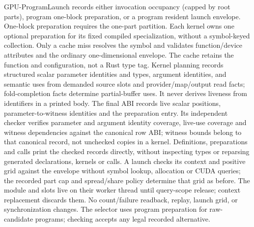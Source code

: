 GPU-ProgramLaunch records either invocation occupancy (capped by root parts),
program one-block preparation, or a program resident launch envelope. One-block
preparation requires the one-part partition. Each kernel owns one optional
preparation for its fixed compiled specialization, without a symbol-keyed
collection. Only a cache miss resolves the symbol and validates function/device
attributes and the ordinary one-dimensional envelope. The cache retains the
function and configuration, not a Rust type tag. Kernel planning records
structured scalar parameter identities and types, argument identities, and
semantic uses from demanded source slots and provider/map/output read facts;
fold-completion facts determine partial-buffer uses. It never derives liveness
from identifiers in a printed body. The final ABI records live scalar
positions, parameter-to-witness identities and the preparation entry.
Its independent checker verifies parameter and argument identity coverage,
live-use coverage and witness dependencies against the canonical row ABI;
witness bounds belong to that canonical record, not unchecked copies in a
kernel. Definitions, preparations and calls print the checked records directly,
without inspecting types or reparsing generated declarations, kernels or calls.
A launch checks its context and positive grid against the envelope without
symbol lookup, allocation or CUDA queries;
the recorded part cap and spread/share policy determine that grid as before.
The module and slots live on their worker thread until query-scope release;
context replacement discards them. No count/failure readback, replay, launch
grid, or synchronization changes. The selector uses program preparation for
raw-candidate programs; checking accepts any legal recorded alternative.
